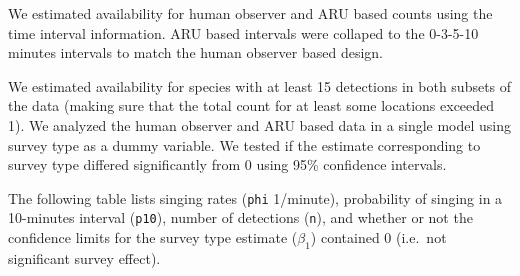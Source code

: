 \documentclass[12pt,]{book}
\newenvironment{Shaded}{\begin{snugshade}}{\end{snugshade}}
\newcommand{\DataTypeTok}[1]{\textcolor[rgb]{0.13,0.29,0.53}{#1}}
\newcommand{\DecValTok}[1]{\textcolor[rgb]{0.00,0.00,0.81}{#1}}
\newcommand{\KeywordTok}[1]{\textcolor[rgb]{0.13,0.29,0.53}{\textbf{#1}}}
\newcommand{\NormalTok}[1]{#1}
\newcommand{\OperatorTok}[1]{\textcolor[rgb]{0.81,0.36,0.00}{\textbf{#1}}}
\newcommand{\OtherTok}[1]{\textcolor[rgb]{0.56,0.35,0.01}{#1}}
\newcommand{\StringTok}[1]{\textcolor[rgb]{0.31,0.60,0.02}{#1}}
\begin{document}
We estimated availability for human observer and ARU based counts
using the time interval information. ARU based intervals were
collaped to the 0-3-5-10 minutes intervals to match the human observer based
design.

\begin{Shaded}
\end{Shaded}

We estimated availability for species with at least 15 detections
in both subsets of the data (making sure that the total count for at least
some locations exceeded 1). We analyzed the human observer and ARU based data
in a single model using survey type as a dummy variable.
We tested if the estimate corresponding to survey type differed significantly
from 0 using 95\% confidence intervals.

The following table lists singing rates (\texttt{phi} 1/minute), probability of
singing in a 10-minutes interval (\texttt{p10}), number of detections (\texttt{n}),
and whether or not the confidence limits for the survey type estimate
(\(\beta_1\)) contained 0 (i.e.~not significant survey effect).
\end{document}
